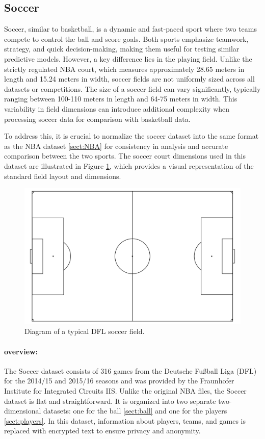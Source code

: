 \subsection{Soccer}
\label{sect:SOC}
Soccer, similar to basketball, is a dynamic and fast-paced sport where two teams compete to control the ball and score goals. Both sports emphasize teamwork, strategy, and quick decision-making, making them useful for testing similar predictive models. However, a key difference lies in the playing field. Unlike the strictly regulated NBA court, which measures approximately 28.65 meters in length and 15.24 meters in width, soccer fields are not uniformly sized across all datasets or competitions. The size of a soccer field can vary significantly, typically ranging between 100-110 meters in length and 64-75 meters in width. This variability in field dimensions can introduce additional complexity when processing soccer data for comparison with basketball data.

To address this, it is crucial to normalize the soccer dataset into the same format as the NBA dataset \ref{sect:NBA} for consistency in analysis and accurate comparison between the two sports. The soccer court dimensions used in this dataset are illustrated in Figure \ref{fig:soccer_court}, which provides a visual representation of the standard field layout and dimensions.

\begin{figure}[t]
    \centering
    \includegraphics[width=\textwidth]{contents/drawing_rg.png}
    \caption{Diagram of a typical DFL soccer field.}
    \label{fig:soccer_court}
\end{figure}



\paragraph {overview:}
\label{soc:details}
The Soccer dataset consists of 316 games from the Deutsche Fu{\ss}ball Liga (DFL) for the 2014/15 and 2015/16 seasons and was provided by the Fraunhofer Institute for Integrated Circuits IIS. Unlike the original NBA files, the Soccer dataset is flat and straightforward. It is organized into two separate two-dimensional datasets: one for the ball \ref{sect:ball} and one for the players \ref{sect:players}. In this dataset, information about players, teams, and games is replaced with encrypted text to ensure privacy and anonymity.

